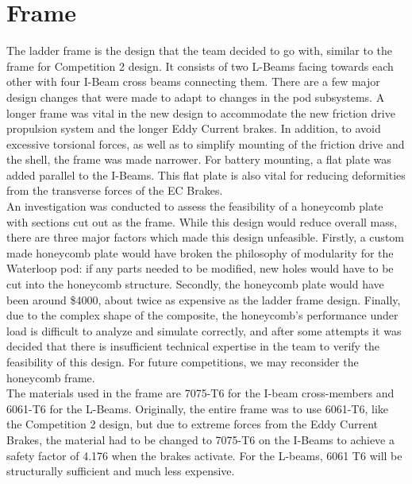 \documentclass[main.tex]{subfiles}
\begin{document}
    \chapter{Frame}
    \label{ch:frame}
        The ladder frame is the design that the team decided to go with, similar to the frame for Competition 2 design. It consists of two L-Beams facing towards each other with four I-Beam cross beams connecting them. There are a few major design changes that were made to adapt to changes in the pod subsystems. A longer frame was vital in the new design to accommodate the new friction drive propulsion system and the longer Eddy Current brakes. In addition, to avoid excessive torsional forces, as well as to simplify mounting of the friction drive and the shell, the frame was made narrower. For battery mounting, a flat plate was added parallel to the I-Beams. This flat plate is also vital for reducing deformities from the transverse forces of the EC Brakes.\\

    An investigation was conducted to assess the feasibility of  a honeycomb plate with sections cut out as the frame. While this design would reduce overall mass, there are three major factors which made this design unfeasible. Firstly, a custom made honeycomb plate would have broken the philosophy of modularity for the Waterloop pod: if any parts needed to be modified, new holes would have to be cut into the honeycomb structure. Secondly, the honeycomb plate would have been around \$4000, about twice as expensive as the ladder frame design. Finally, due to the complex shape of the  composite, the honeycomb’s performance under load is difficult to analyze and simulate correctly, and after some attempts it was decided that there is insufficient technical expertise in the team to verify the feasibility of this design. For future competitions, we may reconsider the honeycomb frame.\\

    The materials used in the frame are 7075-T6 for the I-beam cross-members and 6061-T6 for the L-Beams. Originally, the entire frame was to use 6061-T6, like the Competition 2 design, but due to extreme forces from the Eddy Current Brakes, the material had to be changed to 7075-T6 on the I-Beams to achieve a safety factor of 4.176 when the brakes activate. For the L-beams, 6061 T6 will be structurally sufficient and much less expensive.
\end{document}
